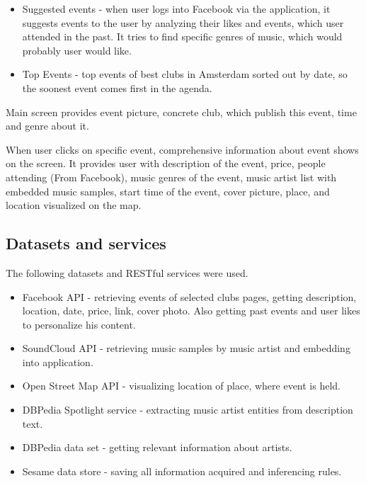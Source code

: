 \documentclass[12pt, a4paper, lithuanian]{article}
\begin{document}
\begin{itemize}

  \item Suggested events - when user logs into Facebook via the application, it suggests events to the user by analyzing their likes and events, which user attended in the past. It tries to find specific genres of music, which would probably user would like.

  \item Top Events - top events of best clubs in Amsterdam sorted out by date, so the soonest event comes first in the agenda.

\end{itemize}

  Main screen provides event picture, concrete club, which publish this event, time and genre about it.

  When user clicks on specific event, comprehensive information about event shows on the screen. It provides user with description of the event, price, people attending (From Facebook), music genres of the event, music artist list with embedded music samples, start time of the event, cover picture, place, and location visualized on the map.

\subsection{Datasets and services}

  The following datasets and RESTful services were used.

\begin{itemize}

  \item Facebook API - retrieving events of selected clubs pages, getting description, location, date, price, link, cover photo. Also getting past events and user likes to personalize his content.

  \item SoundCloud API - retrieving music samples by music artist and embedding into application.

  \item Open Street Map API - visualizing location of place, where event is held.

  \item DBPedia Spotlight service - extracting music artist entities from description text.

  \item DBPedia data set - getting relevant information about artists.

  \item Sesame data store - saving all information acquired and inferencing rules.

\end{itemize}
\end{document}
